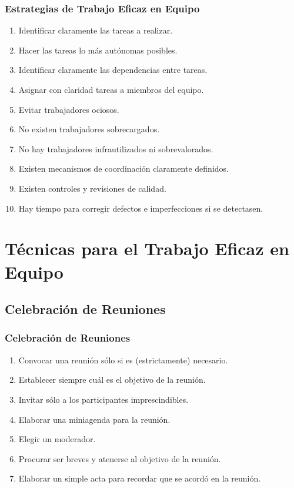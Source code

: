 \documentclass[a4paper,t,xcolor=pst,dvips]{beamer}
\begin{document}
\begin{frame}[c]
	\frametitle{Estrategias de Trabajo Eficaz en Equipo}
	\begin{enumerate}[<+->]
		\item Identificar claramente las tareas a realizar.
		\item Hacer las tareas lo más autónomas posibles.
		\item Identificar claramente las dependencias entre tareas.
		\item Asignar con claridad tareas a miembros del equipo.
		\item Evitar trabajadores ociosos.
		\item No existen trabajadores sobrecargados.
		\item No hay trabajadores infrautilizados ni sobrevalorados.
		\item Existen mecanismos de coordinación claramente definidos.
		\item Existen controles y revisiones de calidad.
		\item Hay tiempo para corregir defectos e imperfecciones si se detectasen.
	\end{enumerate}
\end{frame}

\section{Técnicas para el Trabajo Eficaz en Equipo}

\subsection{Celebración de Reuniones}

\begin{frame}[c]
	\frametitle{Celebración de Reuniones}
	\begin{enumerate}[<+->]
		\item Convocar una reunión sólo si es (estrictamente) necesario.
		\item Establecer siempre cuál es el objetivo de la reunión.
		\item Invitar sólo a los participantes imprescindibles. 
		\item Elaborar una miniagenda para la reunión.
		\item Elegir un moderador.
		\item Procurar ser breves y atenerse al objetivo de la reunión.
		\item Elaborar un simple acta para recordar que se acordó en la reunión.
	\end{enumerate}
\end{frame}
\end{document}
